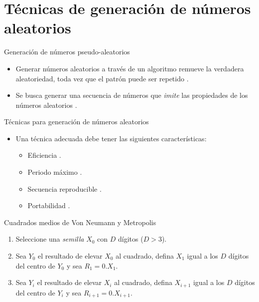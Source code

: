 \section[Técnicas de generación]{Técnicas de generación de números aleatorios}

\begin{frame}{Generación de números pseudo-aleatorios}
    \begin{itemize}
        \item Generar números aleatorios a través de un algoritmo  remueve la verdadera aleatoriedad, toda vez que el patrón puede ser repetido \cite{BCN}.
        \item Se busca generar una secuencia de números que \textit{imite} las propiedades de los números aleatorios  \cite{BCN}.
    \end{itemize}
\end{frame}

\begin{frame}{Técnicas para generación de números aleatorios}
    \begin{itemize}
        \item Una técnica adecuada debe tener las siguientes características:
            \begin{itemize}
                \item Eficiencia \cite{PSD}.
                \item Periodo máximo \cite{PSD}.
                \item Secuencia reproducible \cite{PSD}.  
                \item Portabilidad \cite{LK}.
            \end{itemize}
    \end{itemize}

\end{frame}

\begin{frame}{Cuadrados medios de Von Neumann y Metropolis}
    \begin{enumerate}
        \item Seleccione una \textit{semilla} $X_0$ con $D$ dígitos ($D>3$).
        \item Sea $Y_0$ el resultado de elevar $X_0$ al cuadrado, defina $X_1$ igual a los $D$ dígitos del centro de $Y_0$ y sea $R_1=0.X_1$.
        \item Sea $Y_i$ el resultado de elevar $X_i$ al cuadrado, defina $X_{i+1}$ igual a los $D$ dígitos del centro de $Y_i$ y sea $R_{i+1}=0.X_{i+1}$.
    \end{enumerate}
    
\end{frame}

